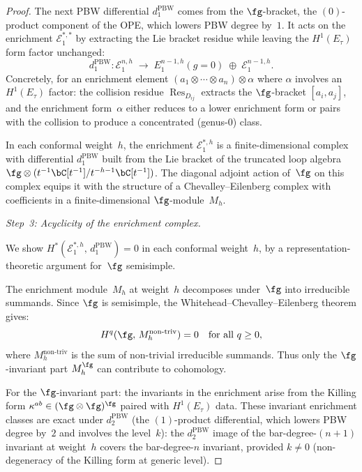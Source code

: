 \begin{proof}
The next PBW differential $d_1^{\mathrm{PBW}}$ comes
from the $\fg$-bracket, the $(0)$-product component
of the OPE, which lowers PBW degree by~$1$.  It acts
on the enrichment $\mathcal{E}^{*,*}_1$ by extracting
the Lie bracket residue while leaving the
$H^1(E_\tau)$ form factor unchanged:
\[
d_1^{\mathrm{PBW}}\colon \mathcal{E}_1^{n, h}
\;\longrightarrow\; E_1^{n-1,h}(g{=}0)
\;\oplus\; \mathcal{E}_1^{n-1, h}.
\]
Concretely, for an enrichment element
$(a_1 \otimes \cdots \otimes a_n) \otimes \alpha$
where $\alpha$ involves an $H^1(E_\tau)$ factor:
the collision residue $\operatorname{Res}_{D_{ij}}$
extracts the $\fg$-bracket $[a_i, a_j]$, and the
enrichment form~$\alpha$ either reduces to a lower
enrichment form or pairs with the collision to produce
a concentrated (genus-$0$) class.

In each conformal
weight~$h$, the enrichment
$\mathcal{E}_1^{*,h}$ is a finite-dimensional complex
with differential $d_1^{\mathrm{PBW}}$ built from the
Lie bracket of the truncated loop algebra
$\fg \otimes (t^{-1}\bC[t^{-1}] / t^{-h-1}\bC[t^{-1}])$.
The diagonal adjoint action of~$\fg$ on this complex
equips it with the structure of a Chevalley--Eilenberg
complex with coefficients in a finite-dimensional
$\fg$-module~$M_h$.

\medskip
\emph{Step~3: Acyclicity of the enrichment complex.}

We show $H^*(\mathcal{E}_1^{*,h},\, d_1^{\mathrm{PBW}}) = 0$
in each conformal weight~$h$, by a representation-theoretic
argument for~$\fg$ semisimple.

The enrichment module~$M_h$ at weight~$h$ decomposes
under~$\fg$ into irreducible summands.  Since $\fg$ is
semisimple, the Whitehead--Chevalley--Eilenberg theorem
gives:
\[
H^q(\fg,\, M_h^{\mathrm{non\text{-}triv}}) = 0
\quad \text{for all } q \geq 0,
\]
where $M_h^{\mathrm{non\text{-}triv}}$ is the sum of
non-trivial irreducible summands.  Thus only the
$\fg$-invariant part $M_h^{\fg}$ can contribute
to cohomology.

For the $\fg$-invariant part: the invariants in the
enrichment arise from the Killing form
$\kappa^{ab} \in (\fg \otimes \fg)^{\fg}$ paired
with $H^1(E_\tau)$ data.  These invariant enrichment classes
are exact under $d_2^{\mathrm{PBW}}$
(the $(1)$-product differential, which lowers PBW
degree by~$2$ and involves the level~$k$): the
$d_2^{\mathrm{PBW}}$ image of the bar-degree-$(n{+}1)$
invariant at weight~$h$ covers the bar-degree-$n$
invariant, provided $k \neq 0$ (non-degeneracy of the
Killing form at generic level).


\end{proof}
